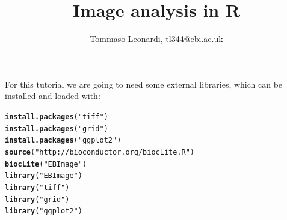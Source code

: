 \documentclass{article}\usepackage[]{graphicx}\usepackage[]{color}
\makeatletter
\newcommand{\hlstr}[1]{\textcolor[rgb]{0.192,0.494,0.8}{#1}}%
\newcommand{\hlstd}[1]{\textcolor[rgb]{0.345,0.345,0.345}{#1}}%
\newcommand{\hlkwd}[1]{\textcolor[rgb]{0.737,0.353,0.396}{\textbf{#1}}}%
\newenvironment{kframe}{%
 \def\at@end@of@kframe{}%
 \ifinner\ifhmode%
  \def\at@end@of@kframe{\end{minipage}}%
  \begin{minipage}{\columnwidth}%
 \fi\fi%
 \def\FrameCommand##1{\hskip\@totalleftmargin \hskip-\fboxsep
 \colorbox{shadecolor}{##1}\hskip-\fboxsep
     \hskip-\linewidth \hskip-\@totalleftmargin \hskip\columnwidth}%
 \MakeFramed {\advance\hsize-\width
   \@totalleftmargin\z@ \linewidth\hsize
   \@setminipage}}%
 {\par\unskip\endMakeFramed%
 \at@end@of@kframe}
\newenvironment{knitrout}{}{} %
\makeatother
\begin{document}
\title{Image analysis in R}
\author{Tommaso Leonardi, tl344@ebi.ac.uk}
\maketitle

For this tutorial we are going to need some external libraries, which can be installed and loaded with:
\begin{knitrout}
\color{fgcolor}\begin{kframe}
\begin{alltt}
\hlkwd{install.packages}\hlstd{(}\hlstr{"tiff"}\hlstd{)}
\hlkwd{install.packages}\hlstd{(}\hlstr{"grid"}\hlstd{)}
\hlkwd{install.packages}\hlstd{(}\hlstr{"ggplot2"}\hlstd{)}
\hlkwd{source}\hlstd{(}\hlstr{"http://bioconductor.org/biocLite.R"}\hlstd{)}
\hlkwd{biocLite}\hlstd{(}\hlstr{"EBImage"}\hlstd{)}
\hlkwd{library}\hlstd{(}\hlstr{"EBImage"}\hlstd{)}
\hlkwd{library}\hlstd{(}\hlstr{"tiff"}\hlstd{)}
\hlkwd{library}\hlstd{(}\hlstr{"grid"}\hlstd{)}
\hlkwd{library}\hlstd{(}\hlstr{"ggplot2"}\hlstd{)}
\end{alltt}
\end{kframe}
\end{knitrout}
\end{document}
